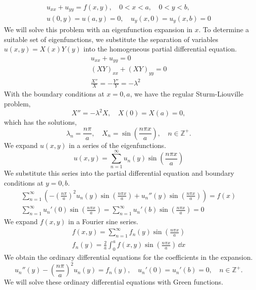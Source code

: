 {%
\begin{Solution}
  \label{solution potential 2d block zero insulated}
  \begin{gather*}
    u_{x x} + u_{y y} = f(x, y), \quad 0 < x < a, \quad 0 < y < b, 
    \\
    u(0,y) = u(a,y) = 0, \quad u_y(x,0) = u_y(x,b) = 0
  \end{gather*}
  We will solve this problem with an eigenfunction expansion in $x$.  
  To determine a suitable set of eigenfunctions, 
  we substitute the separation of variables $u(x,y) = X(x) Y(y)$ into the
  homogeneous partial differential equation.
  \begin{gather*}
    u_{x x} + u_{y y} = 0 
    \\
    (X Y)_{x x} + (X Y)_{y y} = 0 
    \\
    \frac{X''}{X} = - \frac{Y''}{Y} = - \lambda^2
  \end{gather*}
  With the boundary conditions at $x = 0,a$, we have the regular 
  Sturm-Liouville problem,
  \[
  X'' = -\lambda^2 X, \quad X(0) = X(a) = 0,
  \]
  which has the solutions,
  \[
  \lambda_n = \frac{n \pi}{a}, \quad
  X_n = \sin \left( \frac{n \pi x}{a} \right), \quad
  n \in \mathbb{Z}^+.
  \]
  We expand $u(x,y)$ in a series of the eigenfunctions.
  \[
  \boxed{
    u(x,y) = \sum_{n=1}^\infty u_n(y) \sin \left( \frac{n \pi x}{a} \right)
    }
  \]
  We substitute this series into the partial differential equation and boundary
  conditions at $y = 0, b$.
  \begin{gather*}
    \sum_{n=1}^\infty \left( - \left( \frac{n \pi}{a} \right)^2 
      u_n(y) \sin \left( \frac{n \pi x}{a} \right)
      + u_n''(y) \sin \left( \frac{n \pi x}{a} \right) \right) = f(x)
    \\
    \sum_{n=1}^\infty u_n'(0) \sin \left( \frac{n \pi x}{a} \right) =
    \sum_{n=1}^\infty u_n'(b) \sin \left( \frac{n \pi x}{a} \right) = 0
  \end{gather*}
  We expand $f(x,y)$ in a Fourier sine series.
  \begin{gather*}
    f(x,y) = \sum_{n=1}^\infty f_n(y) \sin \left( \frac{n \pi x}{a} \right)
    \\
    \boxed{
      f_n(y) = \frac{2}{a} \int_0^a f(x,y) \sin \left( \frac{n \pi x}{a} \right) \,\dd x
      }
  \end{gather*}
  We obtain the ordinary differential equations for the coefficients in the 
  expansion.
  \[
  u_n''(y) - \left( \frac{n \pi}{a} \right)^2 u_n(y) = f_n(y), \quad
  u_n'(0) = u_n'(b) = 0, \quad n \in \mathbb{Z}^+.
  \]
  We will solve these ordinary differential equations with Green functions.


\end{Solution}}
